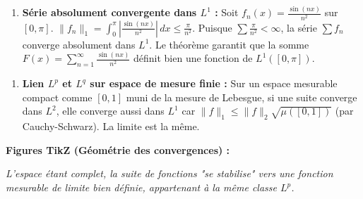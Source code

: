 \documentclass[11pt,a4paper]{article}
\begin{document}
\begin{enumerate}
\item \textbf{Série absolument convergente dans $L^1$ :} Soit $f_n(x) = \frac{\sin(n x)}{n^2}$ sur $[0, \pi]$.
   $\|f_n\|_1 = \int_0^\pi \left|\frac{\sin(nx)}{n^2}\right| \, dx \le \frac{\pi}{n^2}$.
   Puisque $\sum \frac{\pi}{n^2} < \infty$, la série $\sum f_n$ converge absolument dans $L^1$. Le théorème garantit que la somme $F(x) = \sum_{n=1}^\infty \frac{\sin(nx)}{n^2}$ définit bien une fonction de $L^1([0, \pi])$.
\end{enumerate}

\begin{enumerate}
\item \textbf{Lien $L^p$ et $L^q$ sur espace de mesure finie :} Sur un espace mesurable compact comme $[0, 1]$ muni de la mesure de Lebesgue, si une suite converge dans $L^2$, elle converge aussi dans $L^1$ car $\|f\|_1 \le \|f\|_2 \sqrt{\mu([0,1])}$ (par Cauchy-Schwarz). La limite est la même.
\end{enumerate}

\textbf{Figures TikZ (Géométrie des convergences) :}


\begin{center}
\end{center}

\textit{L'espace étant complet, la suite de fonctions "se stabilise" vers une fonction mesurable de limite bien définie, appartenant à la même classe $L^p$.}
\end{document}
